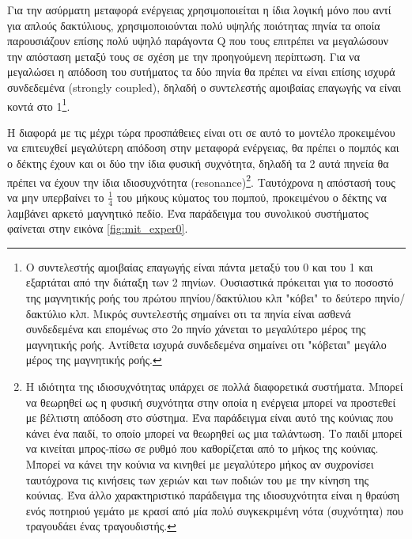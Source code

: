 Για την ασύρματη μεταφορά ενέργειας χρησιμοποιείται η ίδια λογική μόνο που αντί για απλούς δακτύλιους, χρησιμοποιούνται πολύ υψηλής ποιότητας πηνία τα οποία
παρουσιάζουν επίσης πολύ υψηλό παράγοντα Q που τους επιτρέπει να μεγαλώσουν την απόσταση μεταξύ τους σε σχέση με την προηγούμενη περίπτωση. Για να μεγαλώσει η απόδοση
του συτήματος τα δύο πηνία θα πρέπει να είναι επίσης ισχυρά συνδεδεμένα (strongly coupled), δηλαδή ο συντελεστής αμοιβαίας επαγωγής να είναι κοντά στο 1\footnote{Ο
συντελεστής αμοιβαίας επαγωγής είναι πάντα μεταξύ του 0 και του 1 και εξαρτάται από την διάταξη των 2 πηνίων. Ουσιαστικά πρόκειται για το ποσοστό της μαγνητικής ροής
του πρώτου πηνίου/δακτύλιου κλπ "κόβει" το δεύτερο πηνίο/δακτύλιο κλπ. Μικρός συντελεστής σημαίνει οτι τα πηνία είναι ασθενά συνδεδεμένα και επομένως στο 2ο πηνίο
χάνεται το μεγαλύτερο μέρος της μαγνητικής ροής. Αντίθετα ισχυρά συνδεδεμένα σημαίνει οτι "κόβεται" μεγάλο μέρος της μαγνητικής ροής.}.

Η διαφορά με τις μέχρι τώρα προσπάθειες είναι οτι σε αυτό το μοντέλο προκειμένου να επιτευχθεί μεγαλύτερη απόδοση στην μεταφορά ενέργειας, θα πρέπει ο πομπός και ο
δέκτης έχουν και οι δύο την ίδια φυσική συχνότητα, δηλαδή τα 2 αυτά πηνεία θα πρέπει
να έχουν την ίδια ιδιοσυχνότητα (resonance)\footnote{Η ιδιότητα της ιδιοσυχνότητας υπάρχει σε πολλά διαφορετικά συστήματα. Μπορεί να θεωρηθεί  ως  η φυσική
συχνότητα στην οποία η ενέργεια μπορεί να προστεθεί με βέλτιστη απόδοση στο σύστημα. Ένα παράδειγμα είναι αυτό της κούνιας που κάνει ένα παιδί, το οποίο μπορεί να
θεωρηθεί ως μια ταλάντωση. Το παιδί μπορεί να κινείται μπρος-πίσω σε ρυθμό που καθορίζεται από το μήκος της κούνιας. Μπορεί να κάνει την κούνια να κινηθεί με
μεγαλύτερο μήκος αν συχρονίσει ταυτόχρονα τις κινήσεις των χεριών και των ποδιών του με την κίνηση της κούνιας. Ένα άλλο χαρακτηριστικό παράδειγμα της ιδιοσυχνότητα
είναι η θραύση ενός ποτηριού γεμάτο με κρασί από μία πολύ συγκεκριμένη νότα (συχνότητα) που τραγουδάει ένας τραγουδιστής.}. Ταυτόχρονα η απόστασή τους να μην
υπερβαίνει το $\frac{1}{4}$ του μήκους κύματος του πομπού, προκειμένου ο δέκτης να λαμβάνει αρκετό μαγνητικό πεδίο. Ένα παράδειγμα του συνολικού συστήματος φαίνεται
στην εικόνα \ref{fig:mit_exper0}.    


